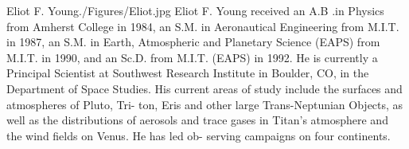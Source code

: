 \documentclass[twocolumn,letterpaper]{IEEEAerospace2012}
\newcommand{\rootdir}{./Figures/}
\begin{document}
\begin{biographywithjpg}{Eliot F. Young}{\rootdir Eliot.jpg}
Eliot F. Young received an A.B .in
Physics from Amherst College in 1984,
an S.M. in Aeronautical Engineering
from M.I.T. in 1987, an S.M. in Earth,
Atmospheric and Planetary Science
(EAPS) from M.I.T. in 1990, and an
Sc.D. from M.I.T. (EAPS) in 1992. He is
currently a Principal Scientist at
Southwest Research Institute in Boulder,
CO, in the Department of Space Studies. His current areas
of study include the surfaces and atmospheres of Pluto, Tri-
ton, Eris and other large Trans-Neptunian Objects, as well
as the distributions of aerosols and trace gases in Titan's
atmosphere and the wind fields on Venus. He has led ob-
serving campaigns on four continents.
\end{biographywithjpg}
\end{document}
